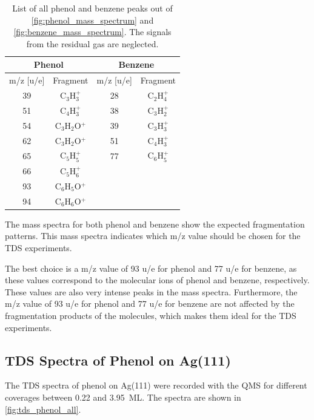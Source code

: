 \documentclass[fontsize=11pt,reqno,a4paper,oneside]{scrartcl}
\begin{document}
\begin{table}[htbp]
    \centering
    \caption{List of all phenol and benzene peaks out of \autoref{fig:phenol_mass_spectrum} and \autoref{fig:benzene_mass_spectrum}. The signals from the residual gas are neglected.}
    \begin{tabular}{@{}cccc@{}}
        \toprule
        \multicolumn{2}{c}{Phenol} & \multicolumn{2}{c}{Benzene} \\
        \midrule
        m/z [u/e] & Fragment & m/z [u/e] & Fragment \\
        \midrule
        39 & C$_3$H$_3^+$ & 28 & C$_2$H$_4^+$ \\
        51 & C$_4$H$_3^+$ & 38 & C$_3$H$_2^+$ \\
        54 & C$_3$H$_2$O$^+$ & 39 & C$_3$H$_3^+$ \\
        62 & C$_3$H$_2$O$^+$ & 51 & C$_4$H$_3^+$ \\
        65 & C$_5$H$_5^+$ & 77 & C$_6$H$_5^+$ \\
        66 & C$_5$H$_6^+$ & & \\
        93 & C$_6$H$_5$O$^+$ & & \\
        94 & C$_6$H$_6$O$^+$ & & \\
        \bottomrule
    \end{tabular}
    \label{tab:mass_spectra_peaks}
\end{table}

The mass spectra for both phenol and benzene show the expected fragmentation patterns. This mass spectra indicates which m/z value should be chosen for the \ac{TDS} experiments.

The best choice is a m/z value of 93 u/e for phenol and 77 u/e for benzene, as these values correspond to the molecular ions of phenol and benzene, respectively. These values are also very intense peaks in the mass spectra. Furthermore, the m/z value of 93 u/e for phenol and 77 u/e for benzene are not affected by the fragmentation products of the molecules, which makes them ideal for the \ac{TDS} experiments.


\clearpage
\subsection{TDS Spectra of Phenol on Ag(111)}

The \ac{TDS} spectra of phenol on Ag(111) were recorded with the \ac{QMS} for different coverages between 0.22 and 3.95~\ac{ML}. The spectra are shown in \autoref{fig:tds_phenol_all}.
\end{document}
